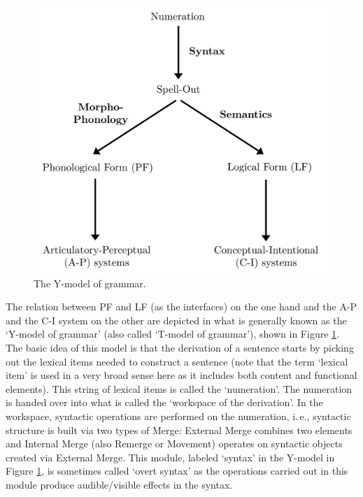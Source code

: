 \begin{figure}[bt]
\centering
	\includegraphics[width=1.0\textwidth]{ymodel.jpg}
	\caption{The Y-model of grammar.}
	\label{ymodel}
\end{figure}

The relation between PF and LF (as the interfaces) on the one hand and the A-P and the C-I system on the other are depicted in what is generally known as the `Y-model of grammar' (also called `T-model of grammar'), shown in Figure \ref{ymodel}. The basic idea of this model is that the derivation of a sentence starts by picking out the lexical items needed to construct a sentence (note that the term `lexical item' is used in a very broad sense here as it includes both content and functional elements). This string of lexical items is called the `numeration'. The numeration is handed over into what is called the `workspace of the derivation'. In the workspace, syntactic operations are performed on the numeration, i.\,e., syntactic structure is built via two types of Merge: External Merge combines two elements and Internal Merge (also Remerge or Movement) operates on syntactic objects created via External Merge. This module, labeled `syntax' in the Y-model in Figure \ref{ymodel}, is sometimes called `overt syntax' as the operations carried out in this module produce audible/visible effects in the syntax.

